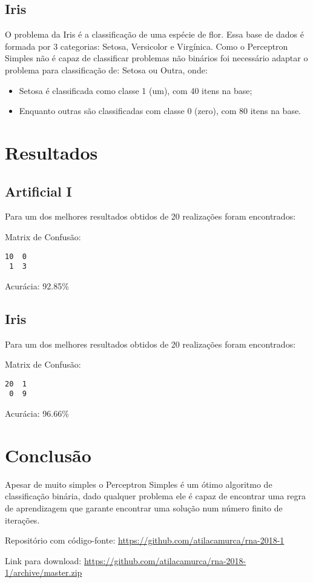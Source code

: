 \subsection{Iris}\label{iris}

O problema da Iris é a classificação de uma espécie de flor. Essa base
de dados é formada por 3 categorias: Setosa, Versicolor e Virgínica.
Como o Perceptron Simples não é capaz de classificar problemas não
binários foi necessário adaptar o problema para classificação de: Setosa
ou Outra, onde:

\begin{itemize}
\tightlist
\item
  Setosa é classificada como classe 1 (um), com 40 itens na base;
\item
  Enquanto outras são classificadas com classe 0 (zero), com 80 itens na
  base.
\end{itemize}

\section{Resultados}\label{resultados}

\subsection{Artificial I}\label{artificial-i-1}

Para um dos melhores resultados obtidos de 20 realizações foram
encontrados:

Matrix de Confusão:

\begin{verbatim}
10  0
 1  3
\end{verbatim}

Acurácia: 92.85\%

\subsection{Iris}\label{iris-1}

Para um dos melhores resultados obtidos de 20 realizações foram
encontrados:

Matrix de Confusão:

\begin{verbatim}
20  1
 0  9
\end{verbatim}

Acurácia: 96.66\%

\section{Conclusão}\label{conclusuxe3o}

Apesar de muito simples o Perceptron Simples é um ótimo algoritmo de
classificação binária, dado qualquer problema ele é capaz de encontrar
uma regra de aprendizagem que garante encontrar uma solução num número
finito de iterações.

Repositório com código-fonte:
\url{https://github.com/atilacamurca/rna-2018-1}

Link para download:
\url{https://github.com/atilacamurca/rna-2018-1/archive/master.zip}

